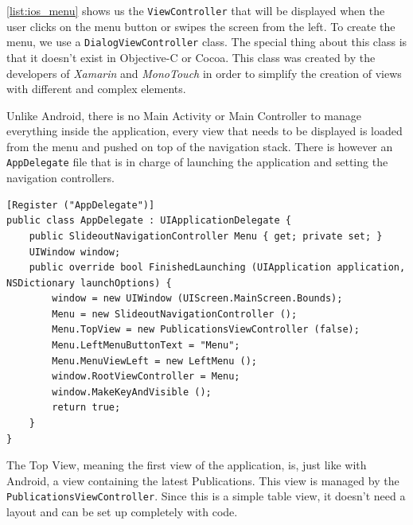 \autoref{list:ios_menu} shows us the \texttt{ViewController} that will be displayed when the user clicks on the menu button or swipes the screen from the left. To create the menu, we use a \texttt{DialogViewController} class. The special thing about this class is that it doesn't exist in  Objective-C or Cocoa. This class was created by the developers of \textit{Xamarin} and \textit{MonoTouch} in order to simplify the creation of views with different and complex elements.

Unlike Android, there is no Main Activity or Main Controller to manage everything inside the application, every view that needs to be displayed is loaded from the menu and pushed on top of the navigation stack. There is however an \texttt{AppDelegate} file that is in charge of launching the application and setting the navigation controllers.

\begin{lstlisting}[frame=lt,caption=AppDelegate.cs, label={list:app_delegate}]
[Register ("AppDelegate")]
public class AppDelegate : UIApplicationDelegate {
	public SlideoutNavigationController Menu { get; private set; }
	UIWindow window;
	public override bool FinishedLaunching (UIApplication application, NSDictionary launchOptions) {
		window = new UIWindow (UIScreen.MainScreen.Bounds);
		Menu = new SlideoutNavigationController ();
		Menu.TopView = new PublicationsViewController (false);
		Menu.LeftMenuButtonText = "Menu";
		Menu.MenuViewLeft = new LeftMenu ();
		window.RootViewController = Menu;
		window.MakeKeyAndVisible ();			
		return true;
	}
}
\end{lstlisting}

The Top View, meaning the first view of the application, is, just like with Android, a view containing the latest Publications. This view is managed by the \texttt{PublicationsViewController}. Since this is a simple table view, it doesn't need a layout and can be set up completely with code.

